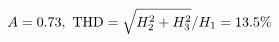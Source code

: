 \documentclass[preview]{standalone}
\begin{document}
\begin{align*}
\special{dvisvgm:raw <g id='unique000'>}A=0.73,\ \text{THD}=\sqrt{H_2^2+H_3^2}/H_1=13.5\%\special{dvisvgm:raw </g>}
\end{align*}
\end{document}
